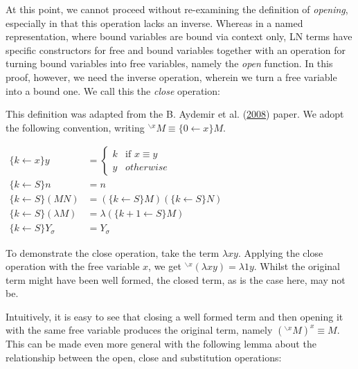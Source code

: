 \documentclass[a4paper, 12pt, twoside]{style/ociamthesis}
\theoremstyle{plain}
\theoremstyle{definition}
\newtheorem{Definition}{Definition}[chapter]
\newtheorem{Example}{Example}[chapter]
\theoremstyle{remark}
\newcommand{\cls}{{}^{\backslash x}}
\renewenvironment{Example}{\begin{OldExample}\begin{mdframed}[style=example, linecolor=yellow]}{\end{mdframed}\end{OldExample}}
\renewenvironment{Definition}{\begin{OldDefinition}\begin{mdframed}[style=example, linecolor=cyan]}{\end{mdframed}\end{OldDefinition}}
\begin{document}
At this point, we cannot proceed without re-examining the definition of
\emph{opening}, especially in that this operation lacks an inverse.
Whereas in a named representation, where bound variables are bound via
context only, LN terms have specific constructors for free and bound
variables together with an operation for turning bound variables into
free variables, namely the \emph{open} function. In this proof, however,
we need the inverse operation, wherein we turn a free variable into a
bound one. We call this the \emph{close} operation:

\begin{Definition}[Close operation]

This definition was adapted from the B. Aydemir et al.
(\protect\hyperlink{ref-aydemir08}{2008}) paper. We adopt the following
convention, writing \(\cls M \equiv \{0 \leftarrow x\}M\).

\begin{center}
$\begin{aligned}
\{k \leftarrow x\}y &= \begin{cases}
k & \text{if }x \equiv y\\
y & otherwise
\end{cases}\\
\{k \leftarrow S\}n &= n\\
\{k \leftarrow S\}(MN) &= (\{k \leftarrow S\}M)(\{k \leftarrow S\}N)\\
\{k \leftarrow S\}(\lambda M) &= \lambda (\{k+1 \leftarrow S\}M)\\
\{k \leftarrow S\}Y_\sigma &= Y_\sigma
\end{aligned}$
\end{center}

\end{Definition}

\begin{Example}

To demonstrate the close operation, take the term \(\lambda xy\).
Applying the close operation with the free variable \(x\), we get
\(\cls (\lambda xy) = \lambda 1y\). Whilst the original term might have
been well formed, the closed term, as is the case here, may not be.

\end{Example}

Intuitively, it is easy to see that closing a well formed term and then
opening it with the same free variable produces the original term,
namely \((\cls M)^x \equiv M\). This can be made even more general with
the following lemma about the relationship between the open, close and
substitution operations:
\end{document}
